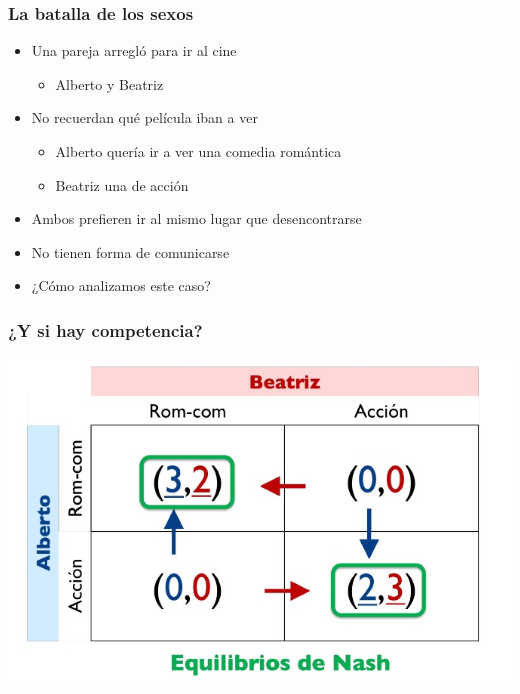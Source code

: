 \documentclass{beamer}
\begin{document}
\begin{frame}
\frametitle{ La batalla de los sexos}
\begin{itemize}
        \item Una pareja arregló para ir al cine
        \begin{itemize}
            \item Alberto y Beatriz
        \end{itemize}
        \item No recuerdan qué película iban a ver
        \begin{itemize}
            \item Alberto quería ir a ver una comedia romántica
            \item Beatriz una de acción
        \end{itemize}
        \item Ambos prefieren ir al mismo lugar que desencontrarse
        \item No tienen forma de comunicarse
        \item ¿Cómo analizamos este caso?
\end{itemize}
\end{frame}

\begin{frame}
\frametitle{¿Y si hay competencia?}
\centering
\includegraphics[scale=0.6]{Slides Principios de Economia/Figures/Tema_03_33_batallasexo.jpg}
\end{frame}
\end{document}
